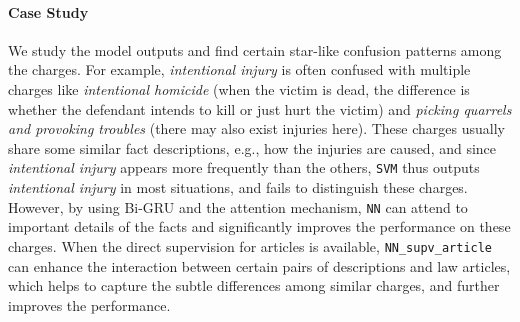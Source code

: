 \paragraph{Case Study}
We study the model outputs and find certain star-like confusion patterns among the charges. For example, \emph{intentional injury} %
is often confused with multiple charges like 
\emph{intentional homicide} (when the victim is dead, the difference is %
 whether the defendant intends to kill  or just hurt the victim) and \emph{picking quarrels and provoking troubles}
(there may also exist injuries here).
These charges usually share some similar fact descriptions, e.g., how the injuries are caused, and since \emph{intentional injury} appears more frequently than the others, \texttt{SVM} thus outputs \emph{intentional injury} in most situations, and fails to distinguish these charges.
However, by using Bi-GRU and the attention mechanism, \texttt{NN} can attend to important details of the facts and significantly improves the performance on these charges.
When the direct supervision for articles is available,  \texttt{NN\_supv\_article}  can enhance the interaction between certain pairs of descriptions and law articles, which helps to capture the subtle differences among similar charges, and further improves the performance.



